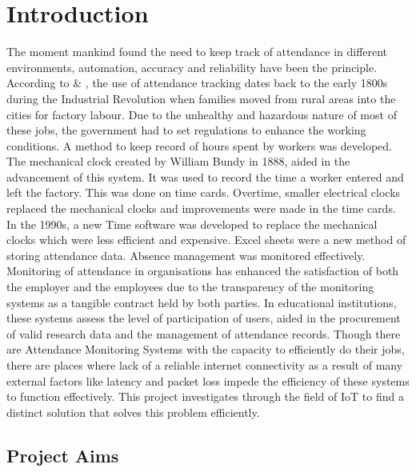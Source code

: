 
\chapter{Introduction} 
The moment mankind found the need to keep track of attendance in different environments, automation, accuracy and reliability have been the principle. According to \citeauthor{HistoryO76:online} \& \citeauthor{TheEvolu41:online}, the use of attendance tracking dates back to the early 1800s during the Industrial Revolution when families moved from rural areas into the cities for factory labour. Due to the unhealthy and hazardous nature of most of these jobs, the government had to set regulations to enhance the working conditions. A method to keep record of hours spent by workers was developed. The mechanical clock created by William Bundy in 1888, aided in the advancement of this system. It was used to record the time a worker entered and left the factory. This was done on time cards. Overtime, smaller electrical clocks replaced the mechanical clocks and improvements were made in the time cards. In the 1990s, a new Time software was developed to replace the mechanical clocks which were less efficient and expensive. Excel sheets were a new method of storing attendance data. Absence management was monitored effectively.\cite{HistoryO76:online, TheEvolu41:online} Monitoring of attendance in organisations has enhanced the satisfaction of both the employer and the employees due to the transparency of the monitoring systems as a tangible contract held by both parties. In educational institutions, these systems assess the level of participation of users, aided in the procurement  of valid research data and the management of attendance records. Though there are Attendance Monitoring Systems with the capacity to efficiently do their jobs, there are places where lack of a reliable internet connectivity as a result of many external factors like latency and packet loss impede the efficiency of these systems to function effectively. This project investigates through the field of \gls{IoT} to find a distinct solution that solves this problem efficiently.
 
\section{Project Aims}
 
